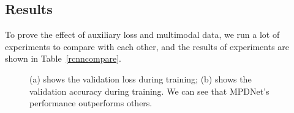 \subsection{Results}
\label{results}
To prove the effect of auxiliary loss and multimodal data, we run a lot of experiments to compare with each other, and the results of experiments are shown in Table~\ref{rcnncompare}.
\begin{figure}[htbp]
    \centering
    \centering
    \caption{(a) shows the validation loss during training; (b) shows the validation accuracy during training. We can see that MPDNet's performance outperforms others.
    }
    \label{loss}

    \end{figure}
